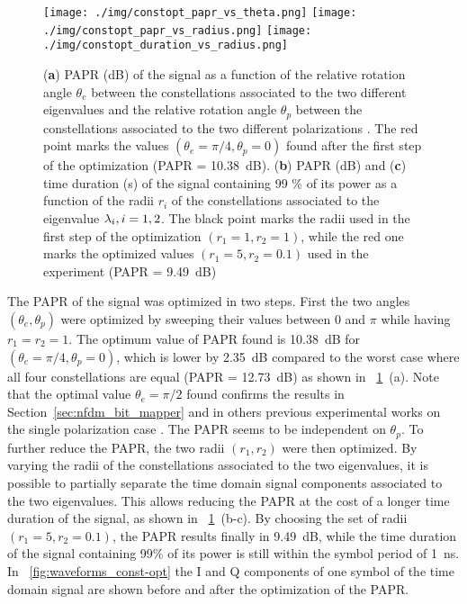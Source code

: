 \begin{figure}[!t]
  \centering
  \texttt{[image: ./img/constopt\_papr\_vs\_theta.png]}\hspace{3cm} %
  \texttt{[image: ./img/constopt\_papr\_vs\_radius.png]}
  \texttt{[image: ./img/constopt\_duration\_vs\_radius.png]}

  \caption{(\textbf{a}) \acs{PAPR} (\si{dB}) of the signal as a function of  the relative rotation angle $\theta_e$ between the constellations associated to the two different eigenvalues  and  the relative rotation angle $\theta_p$ between the constellations associated to the two different polarizations . The red point marks the values $(\theta_e = \pi/4,\theta_p = 0)$ found after the first step of the optimization (\acs{PAPR} = \SI{10.38}{\dB}). (\textbf{b}) \acs{PAPR} (\si{dB}) and (\textbf{c})   time duration (\si{\s}) of the signal containing 99 \% of its power as a function of the radii $r_i$ of the constellations associated to the eigenvalue $\eig[i], i=1,2$. The black point marks the radii used in the first step of the optimization $(r_1 = 1,r_2 = 1)$, while the red one marks the optimized values $(r_1 = 5,r_2 = 0.1)$ used in the experiment (\acs{PAPR} = \SI{9.49}{\dB})}
  \label{fig:theta_vs_papr_neutral}
\end{figure}

The \ac{PAPR} of the signal was optimized in two steps. First the two angles  $(\theta_e,\theta_p)$ were optimized by sweeping their values between $0$ and $\pi$ while having $r_1 = r_2 = 1$. The optimum value of \ac{PAPR} found is \SI{10.38}{\dB} for $(\theta_e = \pi/4,\theta_p = 0)$, which is lower by \SI{2.35}{\dB} compared to the worst case where all four constellations are equal (\ac{PAPR} = \SI{12.73}{\dB}) as shown in
\figurename~\ref{fig:theta_vs_papr_neutral}~(a). Note that the optimal value $\theta_e = \pi/2$ found confirms the results in Section~\ref{sec:nfdm_bit_mapper} and in others previous experimental works on the single polarization case \cite{bulow2016experimental, aref2015experimental}. The \ac{PAPR} seems to be independent on $\theta_p$. To further reduce the \ac{PAPR}, the two radii $(r_1,r_2)$ were then optimized. By varying the radii of the constellations associated to the two eigenvalues, it is possible to partially separate the time domain signal components associated to the two eigenvalues. This allows reducing the \ac{PAPR} at the cost of a longer time duration of the signal, as shown in  \figurename~\ref{fig:theta_vs_papr_neutral}~(b-c). By choosing the set of radii $(r_1 = 5,r_2 = 0.1)$, the \ac{PAPR} results finally in \SI{9.49}{\dB}, while the time duration of the signal containing  99\% of its power is still within the symbol period \Ts{} of \SI{1}{\ns}. In \figurename~\ref{fig:waveforms_const-opt} the \ac{I} and \ac{Q} components of one symbol of the time domain signal are shown before and after the optimization of the \ac{PAPR}.

